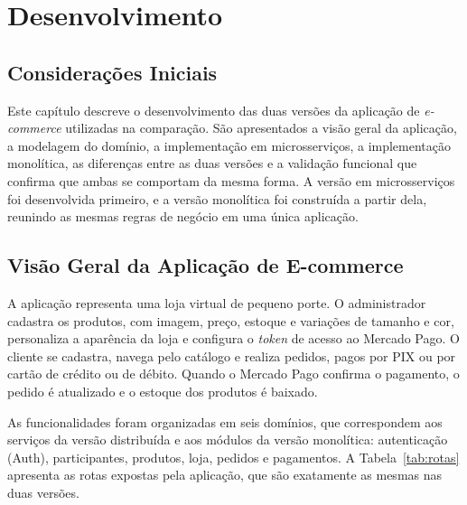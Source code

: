 \chapter{Desenvolvimento}
\label{cap:desenvolvimento}

\section{Considerações Iniciais}

Este capítulo descreve o desenvolvimento das duas versões da aplicação de \textit{e-commerce}
utilizadas na comparação. São apresentados a visão geral da aplicação, a modelagem do domínio,
a implementação em microsserviços, a implementação monolítica, as diferenças entre as duas
versões e a validação funcional que confirma que ambas se comportam da mesma forma. A versão em
microsserviços foi desenvolvida primeiro, e a versão monolítica foi construída a partir dela,
reunindo as mesmas regras de negócio em uma única aplicação.

\section{Visão Geral da Aplicação de E-commerce}

A aplicação representa uma loja virtual de pequeno porte. O administrador cadastra os produtos,
com imagem, preço, estoque e variações de tamanho e cor, personaliza a aparência da loja e
configura o \textit{token} de acesso ao Mercado Pago. O cliente se cadastra, navega pelo
catálogo e realiza pedidos, pagos por PIX ou por cartão de crédito ou de débito. Quando o
Mercado Pago confirma o pagamento, o pedido é atualizado e o estoque dos produtos é baixado.

As funcionalidades foram organizadas em seis domínios, que correspondem aos serviços da versão
distribuída e aos módulos da versão monolítica: autenticação (Auth), participantes, produtos,
loja, pedidos e pagamentos. A Tabela~\ref{tab:rotas} apresenta as rotas expostas pela
aplicação, que são exatamente as mesmas nas duas versões.

